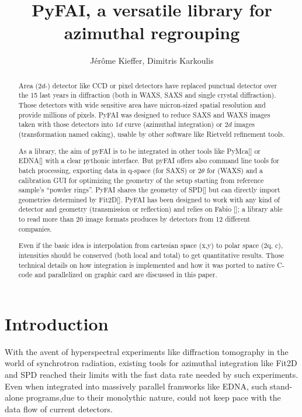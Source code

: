 \documentclass[a4paper]{jpconf}
\begin{document}
\title{PyFAI, a versatile library for azimuthal regrouping}

\author{J\'er\^ome Kieffer, Dimitris Karkoulis}

\address{European Synchrotron Radiation Facility; 6 rue Jules Horowitz;
38043 Grenoble; France}


\begin{abstract}
Area ($2d$-) detector like CCD or pixel detectors have replaced punctual detector
over the 15 last years in diffraction (both in WAXS, SAXS and single crystal
diffraction). Those detectors with wide sensitive area have micron-sized spatial 
resolution and provide millions of pixels. PyFAI was designed to reduce SAXS and
WAXS images taken with those detectors into $1d$ curve (azimuthal integration)
or $2d$ images (transformation named caking), usable by other software like Rietveld 
refinement tools.

As a library, the aim of pyFAI is to be integrated in other tools like PyMca[]
or EDNA[] with a clear pythonic interface. But pyFAI offers also command line
tools for batch processing, exporting data in q-space (for SAXS) or 2$\theta$ for
(WAXS)  and a calibration GUI for optimizing the geometry of the setup starting
from  reference sample's “powder rings”.  PyFAI shares the geometry of SPD[] but
can directly import geometries determined by Fit2D[].  PyFAI has been designed
to  work with any kind of detector and geometry (transmission or reflection) and
relies on Fabio []; a library able to read more than 20 image formats produces
by  detectors from 12 different companies.

Even if the basic idea is interpolation from cartesian space (x,y) to polar 
space (2q, c), intensities should be conserved (both local and total) to get
quantitative results.  Those technical details on how integration is implemented
and how it was ported to native C-code and parallelized on graphic card are
discussed  in this paper.
\end{abstract}

\section{Introduction}

With the avent of hyperspectral experiments like diffraction tomography in the
world of synchrotron radiation, existing tools for azimuthal integration like
Fit2D and SPD reached their limits with the fast data rate needed by such
experiments. Even when integrated into massively parallel framworks like EDNA,
such stand-alone programs,due to their
monolythic nature,  could not keep pace with the data flow of current detectors.
\end{document}
